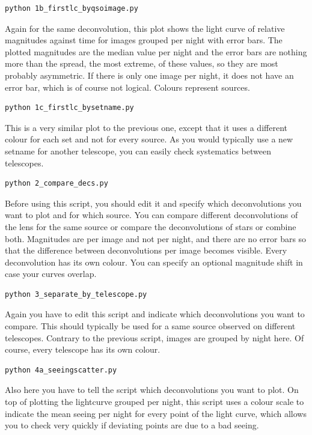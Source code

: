 \begin{Verbatim}
python 1b_firstlc_byqsoimage.py
\end{Verbatim}

Again for the same deconvolution, this plot shows the light curve of relative magnitudes against time for images grouped per night with error bars. The plotted magnitudes are the median value per night and the error bars are nothing more than the spread, the most extreme, of these values, so they are most probably asymmetric. If there is only one image per night, it does not have an error bar, which is of course not logical. Colours represent sources.

\begin{Verbatim}
python 1c_firstlc_bysetname.py
\end{Verbatim}

This is a very similar plot to the previous one, except that it uses a different colour for each set and not for every source. As you would typically use a new setname for another telescope, you can easily check systematics between telescopes.

\begin{Verbatim}
python 2_compare_decs.py
\end{Verbatim}

Before using this script, you should edit it and specify which deconvolutions you want to plot and for which source. You can compare different deconvolutions of the lens for the same source or compare the deconvolutions of stars or combine both. Magnitudes are per image and not per night, and there are no error bars so that the difference between deconvolutions per image becomes visible. Every deconvolution has its own colour. You can specify an optional magnitude shift in case your curves overlap.

\begin{Verbatim}
python 3_separate_by_telescope.py
\end{Verbatim}

Again you have to edit this script and indicate which deconvolutions you want to compare. This should typically be used for a same source observed on different telescopes. Contrary to the previous script, images are grouped by night here. Of course, every telescope has its own colour.

\begin{Verbatim}
python 4a_seeingscatter.py
\end{Verbatim}

Also here you have to tell the script which deconvolutions you want to plot. On top of plotting the lightcurve grouped per night, this script uses a colour scale to indicate the mean seeing per night for every point of the light curve, which allows you to check very quickly if deviating points are due to a bad seeing.

